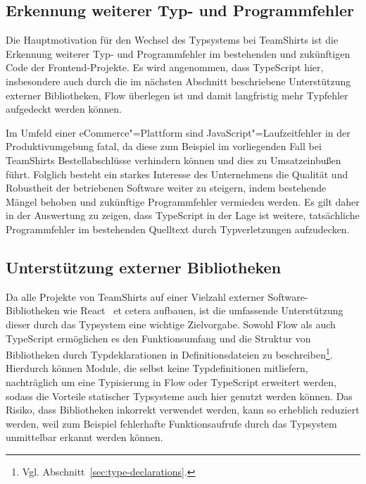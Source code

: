 \subsection{Erkennung weiterer Typ- und Programmfehler}

Die Hauptmotivation für den Wechsel des Typsystems bei TeamShirts ist die Erkennung weiterer Typ- und Programmfehler im bestehenden und zukünftigen Code der Frontend-Projekte. Es wird angenommen, dass TypeScript hier, insbesondere auch durch die im nächsten Abschnitt beschriebene Unterstützung externer Bibliotheken, Flow überlegen ist und damit langfristig mehr Typfehler aufgedeckt werden können.

Im Umfeld einer eCommerce"=Plattform sind JavaScript"=Laufzeitfehler in der Produktivumgebung fatal, da diese zum Beispiel im vorliegenden Fall bei TeamShirts Bestellabschlüsse verhindern können und dies zu Umsatzeinbußen führt. Folglich besteht ein starkes Interesse des Unternehmens die Qualität und Robustheit der betriebenen Software weiter zu steigern, indem bestehende Mängel behoben und zukünftige Programmfehler vermieden werden. Es gilt daher in der Auswertung zu zeigen, dass TypeScript in der Lage ist weitere, tatsächliche Programmfehler im bestehenden Quelltext durch Typverletzungen aufzudecken.

\subsection{Unterstützung externer Bibliotheken}

Da alle Projekte von TeamShirts auf einer Vielzahl externer Software-Bibliotheken wie React~\autocite{SOFTWARE:REACT} et cetera aufbauen, ist die umfassende Unterstützung dieser durch das Typsystem eine wichtige Zielvorgabe. Sowohl Flow als auch TypeScript ermöglichen es den Funktionsumfang und die Struktur von Bibliotheken durch Typdeklarationen in Definitionsdateien zu beschreiben\footnote{Vgl. Abschnitt~\ref{sec:type-declarations}.}. Hierdurch können Module, die selbst keine Typdefinitionen mitliefern, nachträglich um eine Typisierung in Flow oder TypeScript erweitert werden, sodass die Vorteile statischer Typsysteme auch hier genutzt werden können. Das Risiko, dass Bibliotheken inkorrekt verwendet werden, kann so erheblich reduziert werden, weil zum Beispiel fehlerhafte Funktionsaufrufe durch das Typsystem unmittelbar erkannt werden können.

